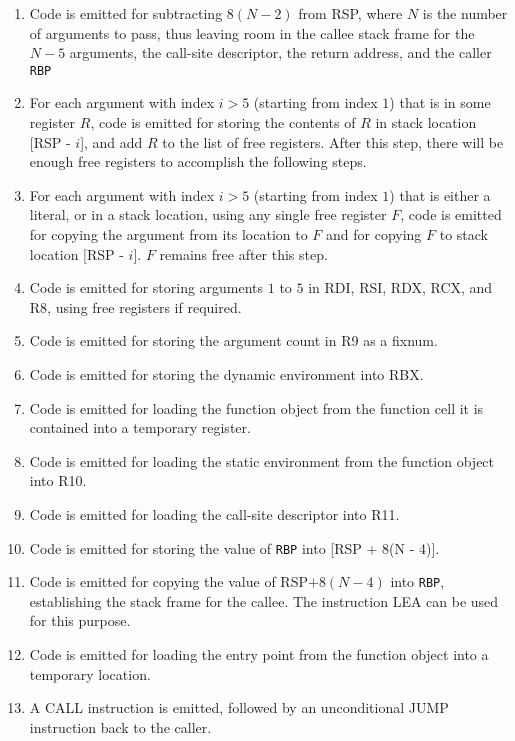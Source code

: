\begin{enumerate}
\item Code is emitted for subtracting $8(N - 2)$ from RSP, where $N$
  is the number of arguments to pass, thus leaving room in the callee
  stack frame for the $N - 5$ arguments, the call-site descriptor, the
  return address, and the caller \texttt{RBP}
\item For each argument with index $i > 5$ (starting from index $1$)
  that is in some register $R$, code is emitted for storing the
  contents of $R$ in stack location [RSP - $i$], and add $R$ to the
  list of free registers.  After this step, there will be enough free
  registers to accomplish the following steps.
\item For each argument with index $i > 5$ (starting from index $1$)
  that is either a literal, or in a stack location, using any single
  free register $F$, code is emitted for copying the argument from its
  location to $F$ and for copying $F$ to stack location [RSP - $i$].
  $F$ remains free after this step.
\item Code is emitted for storing arguments $1$ to $5$ in RDI, RSI,
  RDX, RCX, and R8, using free registers if required.
\item Code is emitted for storing the argument count in R9 as a fixnum.
\item Code is emitted for storing the dynamic environment into RBX.
\item Code is emitted for loading the function object from the
  function cell it is contained into a temporary register.
\item Code is emitted for loading the static environment from the
  function object into R10.
\item Code is emitted for loading the call-site descriptor into R11.
\item Code is emitted for storing the value of \texttt{RBP} into [RSP
  + 8(N - 4)].
\item Code is emitted for copying the value of RSP$ + 8(N - 4)$ into
  \texttt{RBP}, establishing the stack frame for the callee.  The
  instruction LEA can be used for this purpose.
\item Code is emitted for loading the entry point from the function
  object into a temporary location.
\item A CALL instruction is emitted, followed by an unconditional JUMP
  instruction back to the caller.
\end{enumerate}

